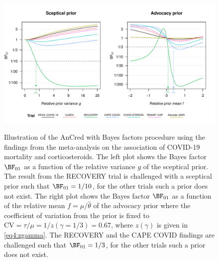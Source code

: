 \begin{figure}[!htb]
\begin{knitrout}
\color{fgcolor}
{\centering \includegraphics[width=\maxwidth]{images/paper4/AnCred-BF-examples-plot-1}
}
\end{knitrout}
\caption{Illustration of the AnCred with Bayes factors procedure using the
  findings from the meta-analysis on the association of COVID-19 mortality and
  corticosteroids. The left plot shows the Bayes factor $\BF_{01}$ as a function
  of the relative variance $g$ of the sceptical prior. The result from the
  RECOVERY trial is challenged with a sceptical prior such that
  $\BF_{01} = 1/10$, for the other trials such a prior does not exist. The right
  plot shows the Bayes factor $\BF_{01}$ as a function of the relative mean
  $f = \mu/\hat{\theta}$ of the advocacy prior where the coefficient of
  variation from the prior is fixed to
  $\text{CV} = \tau/\mu = 1/z(\gamma=1/3) = 0.67$, where $z(\gamma)$ is given in
  \eqref{eq4:zgamma}. The RECOVERY and the CAPE COVID findings are challenged
  such that $\BF_{01} = 1/3$, for the other trials such a prior does not exist.}
\label{fig4:bf}
\end{figure}

